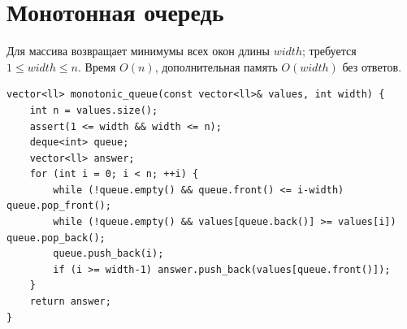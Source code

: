 \fi
\section{Монотонная очередь}
Для массива возвращает минимумы всех окон длины $width$; требуется $1\le width\le n$.
Время $O(n)$, дополнительная память $O(width)$ без ответов.
\begin{lstlisting}[name=monotonic_queue]
vector<ll> monotonic_queue(const vector<ll>& values, int width) {
    int n = values.size();
    assert(1 <= width && width <= n);
    deque<int> queue;
    vector<ll> answer;
    for (int i = 0; i < n; ++i) {
        while (!queue.empty() && queue.front() <= i-width) queue.pop_front();
        while (!queue.empty() && values[queue.back()] >= values[i]) queue.pop_back();
        queue.push_back(i);
        if (i >= width-1) answer.push_back(values[queue.front()]);
    }
    return answer;
}
\end{lstlisting}
%

\iffalse
